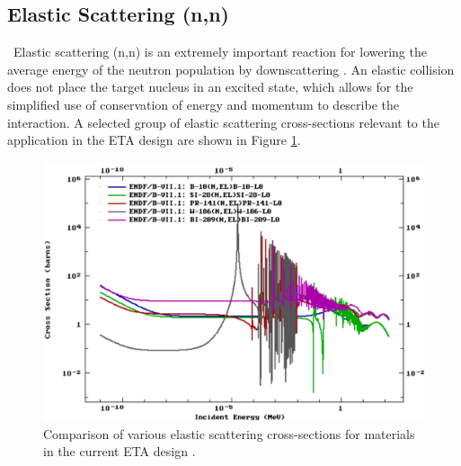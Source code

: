 


\subsection{Elastic Scattering (n,n)}

\ Elastic scattering (n,n) is an extremely important reaction for lowering the average energy of the neutron population by downscattering \cite{Turner}. 
An elastic collision does not place the target nucleus in an excited state, which allows for the simplified use of conservation of energy and momentum to describe the interaction. 
A selected group of elastic scattering cross-sections relevant to the application in the ETA design are shown in Figure \ref{fig:elastic}. 

\begin{figure}[ht]
	\includegraphics[width=\linewidth]{Figures/Chapter2/elastic.png}
	\caption[Comparison of various elastic scattering cross-sections for materials in the current ETA design]{Comparison of various elastic scattering cross-sections for materials in the current ETA design \cite{ENDF}.}
	\label{fig:elastic}
\end{figure}

